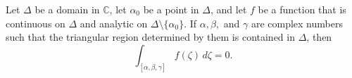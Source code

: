 Let $\Delta$ be a domain in $\mathbb{C}$, let $\alpha_0$ be a point in $\Delta$, and let $f$ be a function that is continuous on $\Delta$ and analytic on $\Delta \setminus \{\alpha_0\}$. If $\alpha, \beta,$ and $\gamma$ are complex numbers such that the triangular region determined by them is contained in $\Delta$, then
$$\int_{[\alpha, \beta, \gamma]} f(\zeta) \, d\zeta = 0.$$
